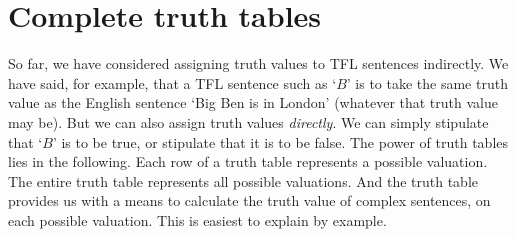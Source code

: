 \chapter{Complete truth tables}\label{s:CompleteTruthTables}
So far, we have considered assigning truth values to TFL sentences indirectly. We have said, for example, that a TFL sentence such as `$B$' is to take the same truth value as the English sentence `Big Ben is in London' (whatever that truth value may be). But we can also assign truth values \emph{directly}. We can simply stipulate that `$B$' is to be true, or stipulate that it is to be false.
The power of truth tables lies in the following. Each row of a truth table represents a possible valuation. The entire truth table represents all possible valuations. And the truth table provides us with a means to calculate the truth value of complex sentences, on each possible valuation. This is easiest to explain by example.

